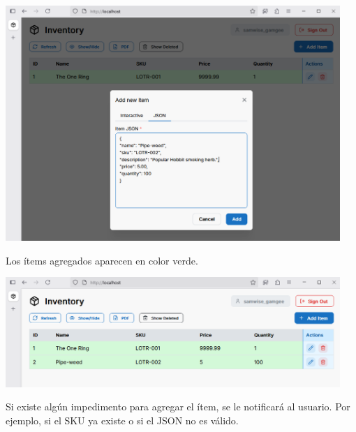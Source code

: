 \begin{center}
\includegraphics[width=0.95\textwidth]{images/7 Agregar JSON}
\end{center}

Los ítems agregados aparecen en color verde.

\begin{center}
\includegraphics[width=0.95\textwidth]{images/8 Agregado}
\end{center}

Si existe algún impedimento para agregar el ítem, se le notificará al usuario. Por ejemplo, si el SKU ya existe o si el JSON no es válido.

